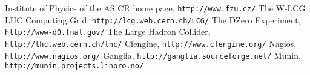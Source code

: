 \documentclass{article}
\begin{document}
\begin{thebibliography}{9}
    Institute of Physics of the AS CR home page, {\tt http://www.fzu.cz/}
    The W-LCG LHC Computing Grid, {\tt http://lcg.web.cern.ch/LCG/}
    The DZero Experiment, {\tt http://www-d0.fnal.gov/}
    The Large Hadron Collider, {\tt http://lhc.web.cern.ch/lhc/}
    Cfengine, {\tt http://www.cfengine.org/}
    Nagios, {\tt http://www.nagios.org/}
    Ganglia, {\tt http://ganglia.sourceforge.net/}
    Munin, {\tt http://munin.projects.linpro.no/}
\end{thebibliography}
\end{document}
